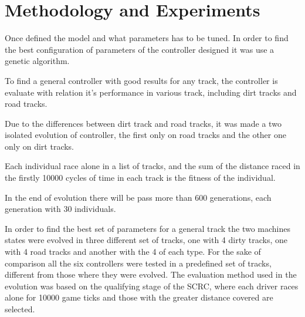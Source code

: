 \section{Methodology and Experiments} \label{sec:exp}
	Once defined the model and what parameters has to be tuned. In order to find the best configuration of parameters of the controller designed it was use a genetic algorithm.
	
	To find a general controller with good results for any track, the controller is evaluate with relation it's performance in various track, including dirt tracks and road tracks. 
	
	Due to the differences between dirt track and road tracks, it was made a two isolated evolution of controller, the first only on road tracks and the other one only on dirt tracks.
	
	Each individual race alone in a list of tracks, and the sum of the distance raced in the firstly 10000 cycles of time in each track is the fitness of the individual.
	
	In the end of evolution there will be pass more than 600 generations, each generation with 30 individuals.
	
	In order to find the best set of parameters for a general track the two machines states were evolved in three different set of tracks, one with 4 dirty tracks, one with 4 road tracks and another with the 4 of each type. 
	For the sake of comparison all the six controllers were tested in a predefined set of tracks, different from those where they were evolved.
	The evaluation method used in the evolution was based on the qualifying stage of the SCRC, where each driver races alone for 10000 game ticks and those with the greater distance covered are selected.
	
	
